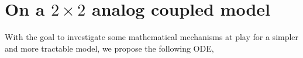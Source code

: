 \documentclass[final,1p,times]{elsarticle}
\begin{document}

\section{On a $2\times2$ analog coupled model}
With the goal to investigate some mathematical mechanisms at play for a simpler and more tractable model, we propose the following ODE,
\end{document}
